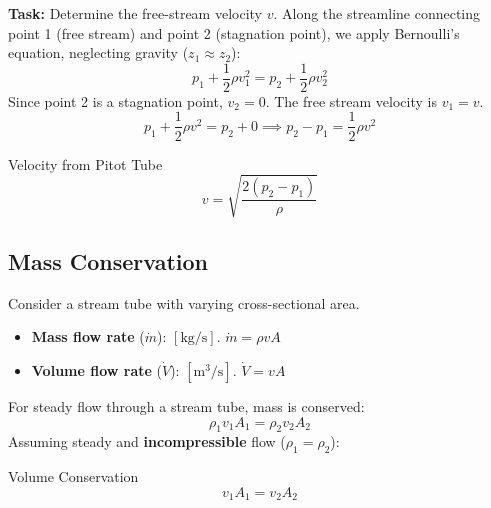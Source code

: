\textbf{Task:} Determine the free-stream velocity $v$.
Along the streamline connecting point 1 (free stream) and point 2 (stagnation point), we apply Bernoulli's equation, neglecting gravity ($z_1 \approx z_2$):
\[
p_{1} + \frac{1}{2}\rho v_{1}^{2} = p_{2} + \frac{1}{2}\rho v_{2}^{2}
\]
Since point 2 is a stagnation point, $v_2 = 0$. The free stream velocity is $v_1 = v$.
\[
p_{1} + \frac{1}{2}\rho v^{2} = p_{2} + 0 \implies p_{2} - p_{1} = \frac{1}{2}\rho v^{2}
\]

\begin{resultboxnamed}{Velocity from Pitot Tube}
\[
v = \sqrt{\frac{2(p_{2} - p_{1})}{\rho}}
\]
\end{resultboxnamed}

\subsection{Mass Conservation}

Consider a stream tube with varying cross-sectional area.
\begin{center}
\end{center}

\begin{itemize}
    \item \textbf{Mass flow rate} ($\dot{m}$): $[\text{kg/s}]$. $\dot{m} = \rho v A$
    \item \textbf{Volume flow rate} ($\dot{V}$): $[\text{m}^3/\text{s}]$. $\dot{V} = v A$
\end{itemize}

For steady flow through a stream tube, mass is conserved:
\[
\rho_{1}v_{1}A_{1} = \rho_{2}v_{2}A_{2}
\]
Assuming steady and \textbf{incompressible} flow ($\rho_1 = \rho_2$):
\begin{eqbox}{Volume Conservation}
\[
v_{1}A_{1} = v_{2}A_{2}
\]
\end{eqbox}

